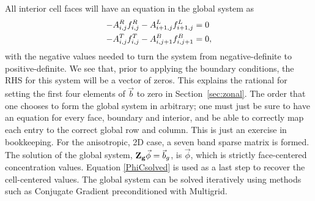 \documentclass[11pt,letterpaper,oneside,notitlepage]{article}	%
\newcommand{\eq}[1]{Equation \eqref{#1}}		%
\numberwithin{equation}{section}				%
\begin{document}
All interior cell faces will have an equation in the global system as
\begin{align} \label{FluxABC}
-A^R_{i,j} f^R_{i,j} - A^L_{i+1,j} f^L_{i+1,j} &= 0 \\	\notag
-A^T_{i,j} f^T_{i,j} - A^B_{i,j+1} f^B_{i,j+1} &= 0 
,\end{align}
with the negative values needed to turn the system from negative-definite to positive-definite. We see that, prior to applying the boundary conditions, the RHS for this system will be a vector of zeros. This explains the rational for setting the first four elements of $\vec b$ to zero in Section~\ref{sec:zonal}. The order that one chooses to form the global system in arbitrary; one must just be sure to have an equation for every face, boundary and interior, and be able to correctly map each entry to the correct global row and column. This is just an exercise in bookkeeping. For the anisotropic, 2D case, a seven band sparse matrix is formed. The solution of the global system, ${\bf Z_g}\vec\phi=\vec b_g$, is $\vec\phi$, which is strictly face-centered concentration values. \eq{PhiCsolved} is used as a last step to recover the cell-centered values. The global system can be solved iteratively using methods such as Conjugate Gradient preconditioned with Multigrid.


\newpage
{}


\end{document}

